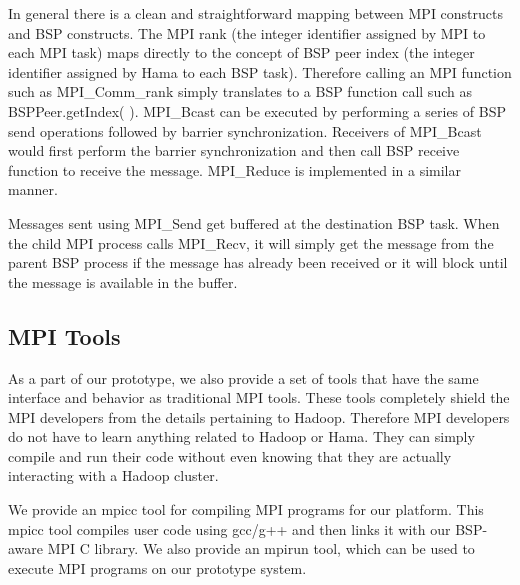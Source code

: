 \documentclass[conference,10pt] {IEEEtran}
\begin{document}
In general there is a clean and straightforward mapping between MPI constructs and BSP constructs. The MPI rank (the integer identifier assigned by MPI to each MPI task) maps directly to the concept of BSP peer index (the integer identifier assigned by Hama to each BSP task). Therefore calling an MPI function such as MPI\_Comm\_rank simply translates to a BSP function call such as BSPPeer.getIndex( ). MPI\_Bcast can be executed by performing a series of BSP send operations followed by barrier synchronization. Receivers of MPI\_Bcast would first perform the barrier synchronization and then call BSP receive function to receive the message. MPI\_Reduce is implemented in a similar manner. 

Messages sent using MPI\_Send get buffered at the destination BSP task. When the child MPI process calls MPI\_Recv, it will simply get the message from the parent BSP process if the message has already been received or it will block until the message is available in the buffer.

\subsection{MPI Tools}
As a part of our prototype, we also provide a set of tools that have the same interface and behavior as traditional MPI tools. These tools completely shield the MPI developers from the details pertaining to Hadoop. Therefore MPI developers do not have to learn anything related to Hadoop or Hama. They can simply compile and run their code without even knowing that they are actually interacting with a Hadoop cluster.

We provide an mpicc tool for compiling MPI programs for our platform. This mpicc tool compiles user code using gcc/g++ and then links it with our BSP-aware MPI C library. We also provide an mpirun tool, which can be used to execute MPI programs on our prototype system. 
\end{document}
